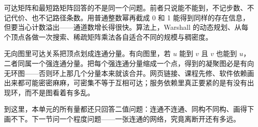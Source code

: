可达矩阵和最短路矩阵回答的不是同一个问题。前者只说能不能到，不记步数、不记代价、也不记路径条数。用普通整数幂再截成 0 和 1 能得到同样的存在信息，但要当心计数溢出——通道数增长得很快。算法上，Warshall 的动态规划、从每个顶点各做一次搜索、稀疏矩阵乘法各自适合不同的规模与稠密度。

无向图里可达关系把顶点划成连通分量。有向图里，若 \(u\) 能到 \(v\) 且 \(v\) 也能到 \(u\)，二者同属一个强连通分量。把每个强连通分量缩成一个点，得到的凝聚图必是有向无环图——否则环上那几个分量本来就该合并。网页链接、课程先修、软件依赖画出来都可能密密麻麻，可密集不等于互相可达；服务依赖里真正要紧的是有没有出现环，而不是图看着有多乱。

到这里，本单元的所有量都还只回答二值问题：连通不连通、同构不同构、画得下画不下。下一节问一个程度问题——一张连通的网络，究竟离断开还有多远。
